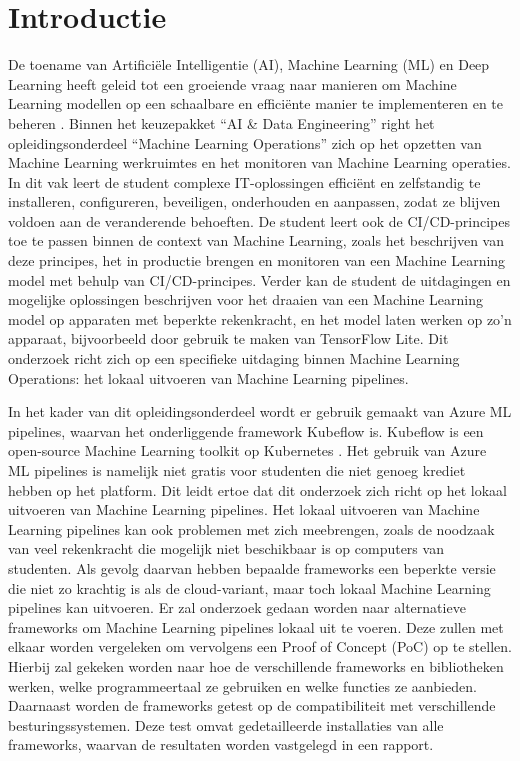 
\section{Introductie}%
\label{sec:introductie}

De toename van Artificiële Intelligentie (AI), Machine Learning (ML) en Deep Learning heeft geleid tot een groeiende vraag naar manieren om Machine Learning modellen op een schaalbare en efficiënte manier te implementeren en te beheren \autocite{Aggarwal2022}.
Binnen het keuzepakket ``AI \& Data Engineering'' right het opleidingsonderdeel ``Machine Learning Operations'' zich op het opzetten van Machine Learning werkruimtes en het monitoren van Machine Learning operaties. In dit vak leert de student complexe IT-oplossingen efficiënt en zelfstandig te installeren, configureren, beveiligen, onderhouden en aanpassen, zodat ze blijven voldoen aan de veranderende behoeften. De student leert ook de CI/CD-principes toe te passen binnen de context van Machine Learning, zoals het beschrijven van deze principes, het in productie brengen en monitoren van een Machine Learning model met behulp van CI/CD-principes. Verder kan de student de uitdagingen en mogelijke oplossingen beschrijven voor het draaien van een Machine Learning model op apparaten met beperkte rekenkracht, en het model laten werken op zo'n apparaat, bijvoorbeeld door gebruik te maken van TensorFlow Lite.
Dit onderzoek richt zich op een specifieke uitdaging binnen Machine Learning Operations: het lokaal uitvoeren van Machine Learning pipelines.

In het kader van dit opleidingsonderdeel wordt er gebruik gemaakt van Azure ML pipelines, waarvan het onderliggende framework Kubeflow is. Kubeflow is een open-source Machine Learning toolkit op Kubernetes \autocite{Kubeflow2021}.
Het gebruik van Azure ML pipelines is namelijk niet gratis voor studenten die niet genoeg krediet hebben op het platform. Dit leidt ertoe dat dit onderzoek zich richt op het lokaal uitvoeren van Machine Learning pipelines.
Het lokaal uitvoeren van Machine Learning pipelines kan ook problemen met zich meebrengen, zoals de noodzaak van veel rekenkracht die mogelijk niet beschikbaar is op computers van studenten. Als gevolg daarvan hebben bepaalde frameworks een beperkte versie die niet zo krachtig is als de cloud-variant, maar toch lokaal Machine Learning pipelines kan uitvoeren.
Er zal onderzoek gedaan worden naar alternatieve frameworks om Machine Learning pipelines lokaal uit te voeren. Deze zullen met elkaar worden vergeleken om vervolgens een Proof of Concept (PoC) op te stellen. Hierbij zal gekeken worden naar hoe de verschillende frameworks en bibliotheken werken, welke programmeertaal ze gebruiken en welke functies ze aanbieden. Daarnaast worden de frameworks getest op de compatibiliteit met verschillende besturingssystemen. Deze test omvat gedetailleerde installaties van alle frameworks, waarvan de resultaten worden vastgelegd in een rapport.

